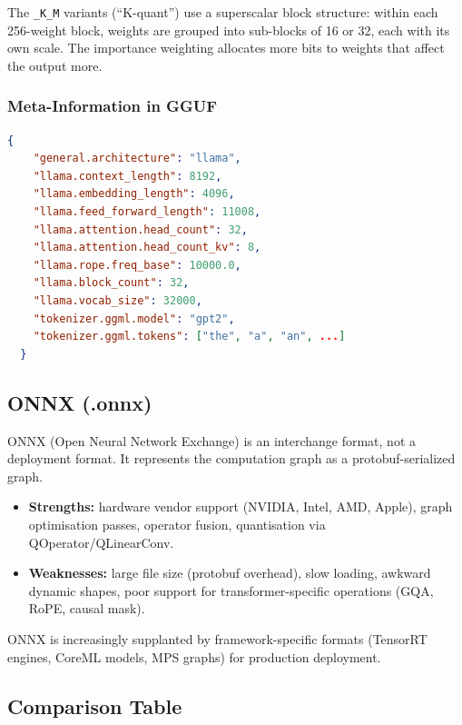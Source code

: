\documentclass[11pt,a4paper]{article}
\theoremstyle{definition}
\begin{document}
The \texttt{\_K\_M} variants (``K-quant'') use a superscalar block structure: within each 256-weight block, weights are grouped into sub-blocks of 16 or 32, each with its own scale. The importance weighting allocates more bits to weights that affect the output more.

\subsubsection{Meta-Information in GGUF}

\begin{lstlisting}[caption=GGUF metadata keys (excerpt), language=Json]
  {
    "general.architecture": "llama",
    "llama.context_length": 8192,
    "llama.embedding_length": 4096,
    "llama.feed_forward_length": 11008,
    "llama.attention.head_count": 32,
    "llama.attention.head_count_kv": 8,
    "llama.rope.freq_base": 10000.0,
    "llama.block_count": 32,
    "llama.vocab_size": 32000,
    "tokenizer.ggml.model": "gpt2",
    "tokenizer.ggml.tokens": ["the", "a", "an", ...]
  }
\end{lstlisting}

\subsection{ONNX (.onnx)}

ONNX (Open Neural Network Exchange) is an interchange format, not a deployment format. It represents the computation graph as a protobuf-serialized graph.

\begin{itemize}
	\item \textbf{Strengths:} hardware vendor support (NVIDIA, Intel, AMD, Apple), graph optimisation passes, operator fusion, quantisation via QOperator/QLinearConv.
	\item \textbf{Weaknesses:} large file size (protobuf overhead), slow loading, awkward dynamic shapes, poor support for transformer-specific operations (GQA, RoPE, causal mask).
\end{itemize}

ONNX is increasingly supplanted by framework-specific formats (TensorRT engines, CoreML models, MPS graphs) for production deployment.

\subsection{Comparison Table}
\end{document}
